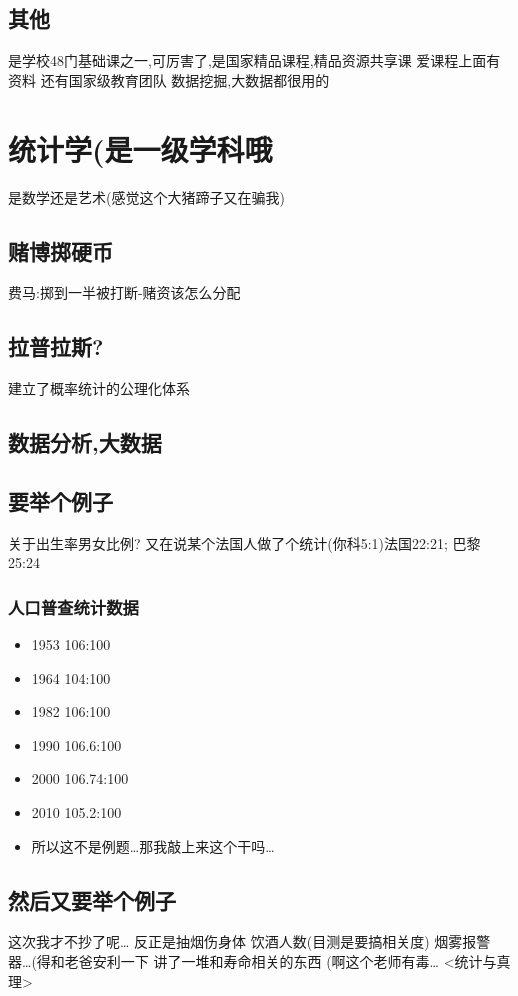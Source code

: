 \documentclass[11pt]{article}
\begin{document}
\subsection{其他}
\label{sec:org6496ab6}
是学校48门基础课之一,可厉害了,是国家精品课程,精品资源共享课
爱课程上面有资料
还有国家级教育团队
数据挖掘,大数据都很用的
\section{统计学(是一级学科哦}
\label{sec:org5e3750b}
是数学还是艺术(感觉这个大猪蹄子又在骗我)
\subsection{赌博掷硬币}
\label{sec:org78cd1f8}
费马:掷到一半被打断-赌资该怎么分配
\subsection{拉普拉斯?}
\label{sec:org9a31c44}
建立了概率统计的公理化体系
\subsection{数据分析,大数据}
\label{sec:org5be7d7b}
\subsection{要举个例子}
\label{sec:orgc6ef89e}
关于出生率男女比例?
又在说某个法国人做了个统计(你科5:1)法国22:21;
巴黎25:24
\subsubsection{人口普查统计数据}
\label{sec:org55e5831}
\begin{itemize}
\item 1953 106:100
\item 1964 104:100
\item 1982 106:100
\item 1990 106.6:100
\item 2000 106.74:100
\item 2010 105.2:100
\item 所以这不是例题\ldots{}那我敲上来这个干吗\ldots{}
\end{itemize}
\subsection{然后又要举个例子}
\label{sec:org7217ed7}
这次我才不抄了呢\ldots{}
反正是抽烟伤身体
饮酒人数(目测是要搞相关度)
烟雾报警器\ldots{}(得和老爸安利一下
讲了一堆和寿命相关的东西
(啊这个老师有毒\ldots{}
<统计与真理>
\end{document}
